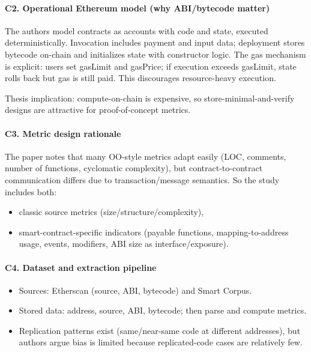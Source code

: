 \documentclass[11pt,a4paper]{article}
\begin{document}
\paragraph{C2. Operational Ethereum model (why ABI/bytecode matter)}
The authors model contracts as accounts with code and state, executed deterministically. Invocation includes payment and input data; deployment stores bytecode on-chain and initializes state with constructor logic. The gas mechanism is explicit: users set gasLimit and gasPrice; if execution exceeds gasLimit, state rolls back but gas is still paid. This discourages resource-heavy execution.

Thesis implication: compute-on-chain is expensive, so store-minimal-and-verify designs are attractive for proof-of-concept metrics.

\paragraph{C3. Metric design rationale}
The paper notes that many OO-style metrics adapt easily (LOC, comments, number of functions, cyclomatic complexity), but contract-to-contract communication differs due to transaction/message semantics. So the study includes both:
\begin{itemize}[leftmargin=*]
  \item classic source metrics (size/structure/complexity),
  \item smart-contract-specific indicators (payable functions, mapping-to-address usage, events, modifiers, ABI size as interface/exposure).
\end{itemize}

\paragraph{C4. Dataset and extraction pipeline}
\begin{itemize}[leftmargin=*]
  \item Sources: Etherscan (source, ABI, bytecode) and Smart Corpus.
  \item Stored data: address, source, ABI, bytecode; then parse and compute metrics.
  \item Replication patterns exist (same/near-same code at different addresses), but authors argue bias is limited because replicated-code cases are relatively few.
\end{itemize}
\end{document}

